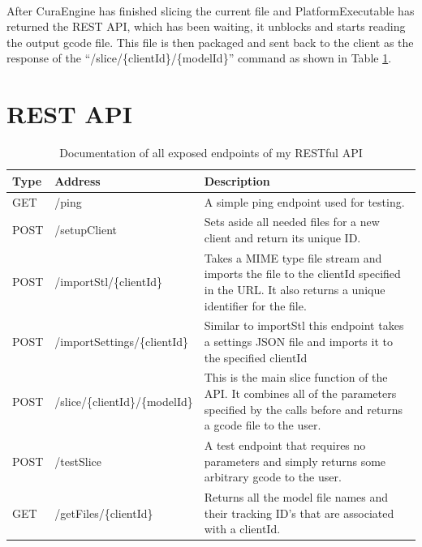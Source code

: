 \paragraph{}
After CuraEngine has finished slicing the current file and PlatformExecutable has returned the REST API, which has been waiting, it unblocks and starts reading the output gcode file.
This file is then packaged and sent back to the client as the response of the ``/slice/\{clientId\}/\{modelId\}'' command as shown in Table \ref{tab:restapi}.

\section{REST API}
\begin{table}[h]
  \centering
    \begin{tabularx}{\textwidth}{ |l|l|X| }
      \hline
      Type & Address & Description \\ \hline
      \hline
      GET & /ping & A simple ping endpoint used for testing. \\ \hline
      POST & /setupClient & Sets aside all needed files for a new client and return its unique ID. \\ \hline
      POST & /importStl/\{clientId\} & Takes a MIME type file stream and imports the file to the clientId specified in the URL. It also returns a unique identifier for the file. \\ \hline
      POST & /importSettings/\{clientId\} & Similar to importStl this endpoint takes a settings JSON file and imports it to the specified clientId \\ \hline
      POST & /slice/\{clientId\}/\{modelId\} & This is the main slice function of the API. It combines all of the parameters specified by the calls before and returns a gcode file to the user. \\ \hline
      POST & /testSlice & A test endpoint that requires no parameters and simply returns some arbitrary gcode to the user. \\ \hline
      GET & /getFiles/\{clientId\} & Returns all the model file names and their tracking ID's that are associated with a clientId. \\ \hline
    \end{tabularx}
  \caption{Documentation of all exposed endpoints of my RESTful API}
  \label{tab:restapi}
\end{table}

